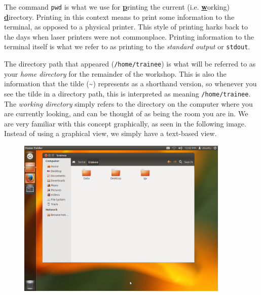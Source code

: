 \begin{information}
The command \texttt{pwd} is what we use for \underline{\textbf{p}}rinting the current (i.e. \underline{\textbf{w}}orking) \underline{\textbf{d}}irectory.
Printing in this context means to print some information to the terminal, as opposed to a physical printer.
This style of printing harks back to the days when laser printers were not commonplace.
Printing information to the terminal itself is what we refer to as printing to the \textit{standard output} or \texttt{stdout}.
\end{information}

\begin{note}
The directory path that appeared  (\texttt{/home/trainee})  is what will be referred to as your \textit{home directory} for the remainder of the workshop.
This is also the information that the tilde (\~{}) represents as a shorthand version, so whenever you see the tilde in a directory path, this is interpreted as meaning \texttt{/home/trainee}. 
The \textit{working directory} simply refers to the directory on the computer where you are currently looking, and can be thought of as being the room you are in.
We are very familiar with this concept graphically, as seen in the following image.
Instead of using a graphical view, we simply have a text-based view.\\
\end{note}

\begin{figure}[h!]
  \centering
    \includegraphics[width=0.9\textwidth]{home.png}
\end{figure}

\FloatBarrier
